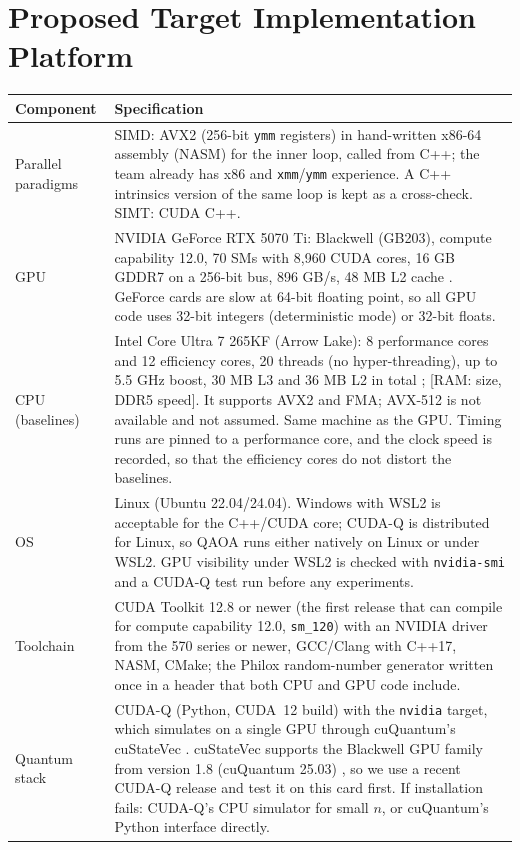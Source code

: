 \section{Proposed Target Implementation Platform}
\label{sec:platform}

\begin{table}[ht]
\centering
\small
\begin{tabularx}{\linewidth}{>{\raggedright\arraybackslash}p{3.2cm}X}
\toprule
Component & Specification \\
\midrule
Parallel paradigms & SIMD: AVX2 (256-bit \texttt{ymm} registers) in hand-written x86-64 assembly (NASM) for the inner loop, called from C++; the team already has x86 and \texttt{xmm}/\texttt{ymm} experience. A C++ intrinsics version of the same loop is kept as a cross-check. SIMT: CUDA C++. \\
GPU & NVIDIA GeForce RTX 5070 Ti: Blackwell (GB203), compute capability 12.0, 70 SMs with 8{,}960 CUDA cores, 16 GB GDDR7 on a 256-bit bus, 896 GB/s, 48 MB L2 cache \cite{rtx5070ti_specs}. GeForce cards are slow at 64-bit floating point, so all GPU code uses 32-bit integers (deterministic mode) or 32-bit floats. \\
CPU (baselines) & Intel Core Ultra 7 265KF (Arrow Lake): 8 performance cores and 12 efficiency cores, 20 threads (no hyper-threading), up to 5.5 GHz boost, 30 MB L3 and 36 MB L2 in total \cite{intel_265kf_ark}; [RAM: size, DDR5 speed]. It supports AVX2 and FMA; AVX-512 is not available and not assumed. Same machine as the GPU. Timing runs are pinned to a performance core, and the clock speed is recorded, so that the efficiency cores do not distort the baselines. \\
OS & Linux (Ubuntu 22.04/24.04). Windows with WSL2 is acceptable for the C++/CUDA core; CUDA-Q is distributed for Linux, so QAOA runs either natively on Linux or under WSL2. GPU visibility under WSL2 is checked with \texttt{nvidia-smi} and a CUDA-Q test run before any experiments. \\
Toolchain & CUDA Toolkit 12.8 or newer (the first release that can compile for compute capability 12.0, \texttt{sm\_120}) with an NVIDIA driver from the 570 series or newer, GCC/Clang with C++17, NASM, CMake; the Philox random-number generator \cite{salmon2011parallel} written once in a header that both CPU and GPU code include. \\
Quantum stack & CUDA-Q (Python, CUDA~12 build) with the \texttt{nvidia} target, which simulates on a single GPU through cuQuantum's cuStateVec \cite{cudaq_docs,bayraktar2023cuquantum}. cuStateVec supports the Blackwell GPU family from version 1.8 (cuQuantum 25.03) \cite{cuquantum_docs}, so we use a recent CUDA-Q release and test it on this card first. If installation fails: CUDA-Q's CPU simulator for small $n$, or cuQuantum's Python interface directly. \\

\end{tabularx}
\end{table}
